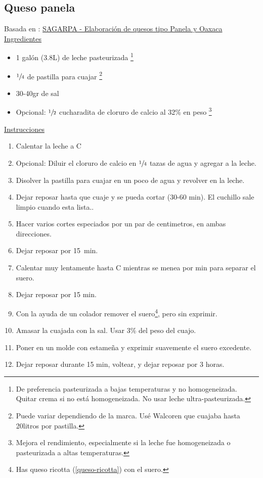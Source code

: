\subsection{Queso panela}

Basada en : \href{http://www.sagarpa.gob.mx/desarrolloRural/Documents/fichasaapt/Elaboraci%C3%B3n%20de%20quesos.pdf}{SAGARPA - Elaboración de quesos tipo Panela y Oaxaca} \\

\underline{Ingredientes}
\begin{itemize}
\item 1 gal\'on (3.8L) de leche pasteurizada \footnote{De preferencia pasteurizada a bajas temperaturas y no homogeneizada. Quitar crema si no está homogeneizada. No usar leche ultra-pasteurizada.}
\item $\sfrac{1}{4}$ de pastilla para cuajar \footnote{Puede variar dependiendo de la marca. Usé Walcoren que cuajaba hasta 
\Sim 20litros por pastilla.}
\item 30-40gr de sal
\item Opcional: $\sfrac{1}{2}$ cucharadita de cloruro de calcio al 32\% en peso \footnote{Mejora el rendimiento, especialmente si la leche fue homogeneizada o pasteurizada a altas temperaturas.}
\end{itemize}


\underline{Instrucciones}
\begin{enumerate}
\item Calentar la leche a  \deg C
\item Opcional: Diluir el cloruro de calcio en $\sfrac{1}{4}$ tazas de agua y agregar a la leche.
\item Disolver la pastilla para cuajar en un poco de agua y revolver en la leche.
\item Dejar reposar hasta que cuaje y se pueda cortar (30-60 min). El cuchillo sale limpio cuando esta lista..
\item Hacer varios cortes especiados por un par de centimetros, en ambas direcciones.
\item Dejar reposar por \SI{15}{min}.
\item Calentar muy lentamente hasta  \deg C mientras se menea por  min para separar el suero.
\item Dejar reposar por 15 min.
\item Con la ayuda de un colador remover el suero\footnote{Has queso ricotta (\ref{queso-ricotta}) con el suero.}, pero sin exprimir.
\item Amasar la cuajada con la sal. Usar 3\% del peso del cuajo.
\item Poner en un molde con estame\~na y exprimir suavemente el suero excedente.
\item Dejar reposar durante 15 min, voltear, y dejar reposar por 3 horas.
\end{enumerate}
